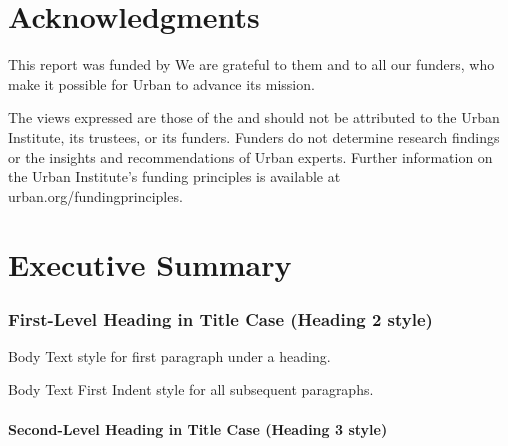 \documentclass{urban-formatting}
\begin{document}
\newpage
\tableofcontents

\newpage
\part*{Acknowledgments}

This report was funded by  We are grateful to them and to all our funders, who make it possible for Urban to advance its mission. 

The views expressed are those of the  and should not be attributed to the Urban Institute, its trustees, or its funders. Funders do not determine research findings or the insights and recommendations of Urban experts. Further information on the Urban Institute’s funding principles is available at urban.org/fundingprinciples.


\newpage
\part*{Executive Summary}


\section*{First-Level Heading in Title Case (Heading 2 style)}

Body Text style for first paragraph under a heading.

Body Text First Indent style for all subsequent paragraphs. 

\subsection*{Second-Level Heading in Title Case (Heading 3 style)}
\end{document}
